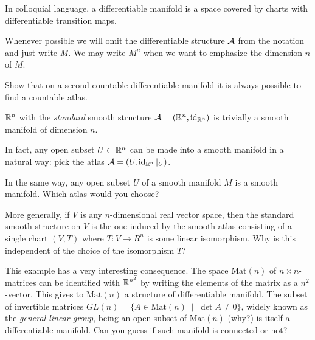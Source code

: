 In colloquial language, a differentiable manifold is a space covered by charts with differentiable transition maps.

Whenever possible we will omit the differentiable structure $\mathcal{A}$ from the notation and just write $M$.
We may write $M^n$ when we want to emphasize the dimension $n$ of $M$.

\begin{exercise}
  Show that on a second countable differentiable manifold it is always possible to find a countable atlas.
\end{exercise}

\begin{exercise}\label{exe:subsetsmanifolds}
  $\mathbb{R}^n$ with the \emph{standard} smooth structure $\mathcal{A}=(\mathbb{R}^n, \operatorname{id}_{\mathbb{R}^n})$ is trivially a smooth manifold of dimension $n$.

  In fact, any open subset $U\subset\mathbb{R}^n$ can be made into a smooth manifold in a natural way: pick the atlas $\mathcal{A}=(U, \operatorname{id}_{\mathbb{R}^n}|_U)$.

  In the same way, any open subset $U$ of a smooth manifold $M$ is a smooth manifold.
  Which atlas would you choose?

  More generally, if $V$ is any $n$-dimensional real vector space, then the standard smooth structure on $V$ is the one induced by the smooth atlas consisting of a single chart $(V, T)$ where $T: V \to R^n$ is some linear isomorphism.
  Why is this independent of the choice of the isomorphism $T$?

  This example has a very interesting consequence.
  The space $\mathrm{Mat}(n)$ of $n\times n$-matrices can be identified with $\mathbb{R}^{n^2}$ by writing the elements of the matrix as a $n^2$-vector.
  This gives to $\mathrm{Mat}(n)$ a structure of differentiable manifold.
  The subset of invertible matrices $GL(n) = \{ A \in \mathrm{Mat}(n) \;\mid\; \det A \neq 0\}$, widely known as the \emph{general linear group}, being an open subset of $\mathrm{Mat}(n)$ (why?) is itself a differentiable manifold.
Can you guess if such manifold is connected or not?
\end{exercise}

